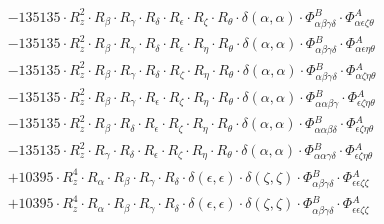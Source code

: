 \documentclass{article}
\begin{document}
\begin{subequations}
\begin{gather}
\begin{array}{c}
 \\[0.2em] 		 - 135135 \cdot R_{z}^{2} \cdot R_{\beta{}} \cdot R_{\gamma{}} \cdot R_{\delta{}} \cdot R_{\epsilon{}} \cdot R_{\zeta{}} \cdot R_{\theta{}} \cdot \delta{}\left(\alpha{}, \alpha{}\right) \cdot \Phi{}^{B}_{\alpha{}\beta{}\gamma{}\delta{}} \cdot \Phi{}^{A}_{\alpha{}\epsilon{}\zeta{}\theta{}} 
 \\[0.2em] 		 - 135135 \cdot R_{z}^{2} \cdot R_{\beta{}} \cdot R_{\gamma{}} \cdot R_{\delta{}} \cdot R_{\epsilon{}} \cdot R_{\eta{}} \cdot R_{\theta{}} \cdot \delta{}\left(\alpha{}, \alpha{}\right) \cdot \Phi{}^{B}_{\alpha{}\beta{}\gamma{}\delta{}} \cdot \Phi{}^{A}_{\alpha{}\epsilon{}\eta{}\theta{}} 
 \\[0.2em] 		 - 135135 \cdot R_{z}^{2} \cdot R_{\beta{}} \cdot R_{\gamma{}} \cdot R_{\delta{}} \cdot R_{\zeta{}} \cdot R_{\eta{}} \cdot R_{\theta{}} \cdot \delta{}\left(\alpha{}, \alpha{}\right) \cdot \Phi{}^{B}_{\alpha{}\beta{}\gamma{}\delta{}} \cdot \Phi{}^{A}_{\alpha{}\zeta{}\eta{}\theta{}} 
 \\[0.2em] 		 - 135135 \cdot R_{z}^{2} \cdot R_{\beta{}} \cdot R_{\gamma{}} \cdot R_{\epsilon{}} \cdot R_{\zeta{}} \cdot R_{\eta{}} \cdot R_{\theta{}} \cdot \delta{}\left(\alpha{}, \alpha{}\right) \cdot \Phi{}^{B}_{\alpha{}\alpha{}\beta{}\gamma{}} \cdot \Phi{}^{A}_{\epsilon{}\zeta{}\eta{}\theta{}} 
 \\[0.2em] 		 - 135135 \cdot R_{z}^{2} \cdot R_{\beta{}} \cdot R_{\delta{}} \cdot R_{\epsilon{}} \cdot R_{\zeta{}} \cdot R_{\eta{}} \cdot R_{\theta{}} \cdot \delta{}\left(\alpha{}, \alpha{}\right) \cdot \Phi{}^{B}_{\alpha{}\alpha{}\beta{}\delta{}} \cdot \Phi{}^{A}_{\epsilon{}\zeta{}\eta{}\theta{}} 
 \\[0.2em] 		 - 135135 \cdot R_{z}^{2} \cdot R_{\gamma{}} \cdot R_{\delta{}} \cdot R_{\epsilon{}} \cdot R_{\zeta{}} \cdot R_{\eta{}} \cdot R_{\theta{}} \cdot \delta{}\left(\alpha{}, \alpha{}\right) \cdot \Phi{}^{B}_{\alpha{}\alpha{}\gamma{}\delta{}} \cdot \Phi{}^{A}_{\epsilon{}\zeta{}\eta{}\theta{}} 
 \\[0.2em] 		 + 10395 \cdot R_{z}^{4} \cdot R_{\alpha{}} \cdot R_{\beta{}} \cdot R_{\gamma{}} \cdot R_{\delta{}} \cdot \delta{}\left(\epsilon{}, \epsilon{}\right) \cdot \delta{}\left(\zeta{}, \zeta{}\right) \cdot \Phi{}^{B}_{\alpha{}\beta{}\gamma{}\delta{}} \cdot \Phi{}^{A}_{\epsilon{}\epsilon{}\zeta{}\zeta{}} 
 \\[0.2em] 		 + 10395 \cdot R_{z}^{4} \cdot R_{\alpha{}} \cdot R_{\beta{}} \cdot R_{\gamma{}} \cdot R_{\delta{}} \cdot \delta{}\left(\epsilon{}, \epsilon{}\right) \cdot \delta{}\left(\zeta{}, \zeta{}\right) \cdot \Phi{}^{B}_{\alpha{}\beta{}\gamma{}\delta{}} \cdot \Phi{}^{A}_{\epsilon{}\epsilon{}\zeta{}\zeta{}} 

\end{array}
\end{gather}
\end{subequations}
\end{document}
